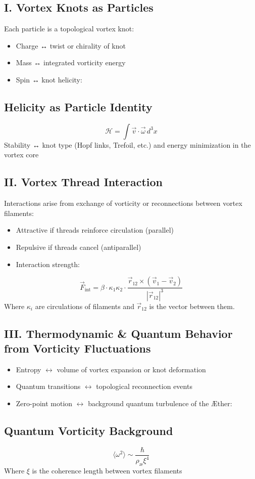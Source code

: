 
\subsection*{I. Vortex Knots as Particles}
Each particle is a topological vortex knot:
\begin{itemize}
    \item Charge ↔ twist or chirality of knot
    \item Mass ↔ integrated vorticity energy
    \item Spin ↔ knot helicity:
\end{itemize}
\subsection*{Helicity as Particle Identity}
\begin{equation}
    \mathcal{H} = \int \vec{v} \cdot \vec{\omega} \, d^3x
\end{equation}
Stability ↔ knot type (Hopf links, Trefoil, etc.) and energy minimization in the vortex core

\subsection*{II. Vortex Thread Interaction}
Interactions arise from exchange of vorticity or reconnections between vortex filaments:
\begin{itemize}
    \item Attractive if threads reinforce circulation (parallel)
    \item Repulsive if threads cancel (antiparallel)
    \item Interaction strength:
\end{itemize}
\begin{equation}
    \vec{F}_{\text{int}} = \beta \cdot \kappa_1 \kappa_2 \cdot \frac{\vec{r}_{12} \times (\vec{v}_1 - \vec{v}_2)}{|\vec{r}_{12}|^3}
\end{equation}
Where \(\kappa_i\) are circulations of filaments and \(\vec{r}_{12}\) is the vector between them.


\subsection*{III. Thermodynamic & Quantum Behavior from Vorticity Fluctuations}
\begin{itemize}
    \item Entropy \(\leftrightarrow\) volume of vortex expansion or knot deformation
    \item Quantum transitions \(\leftrightarrow\) topological reconnection events
    \item Zero-point motion \(\leftrightarrow\) background quantum turbulence of the Æther:
\end{itemize}
\subsection*{Quantum Vorticity Background}
\begin{equation}
    \langle \omega^2 \rangle \sim \frac{\hbar}{\rho_\text{æ} \xi^4}
\end{equation}
Where \(\xi\) is the coherence length between vortex filaments
